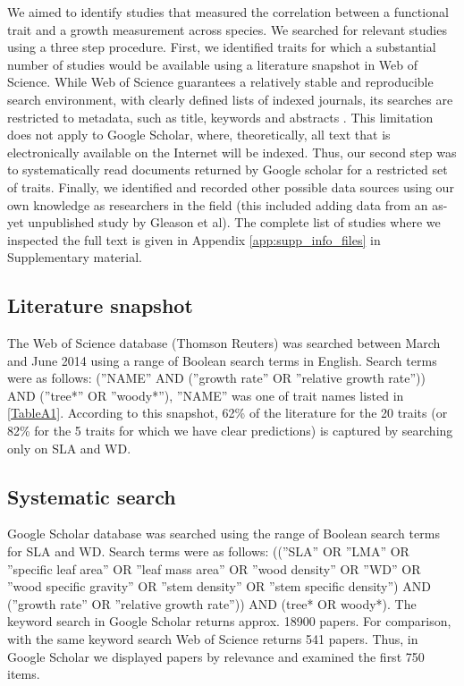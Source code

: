 \documentclass[a4paper]{article}\usepackage[]{graphicx}\usepackage[]{color}
\begin{document}
We aimed to identify studies that measured the correlation between a functional trait and a growth measurement across species. We searched for relevant studies using a three step procedure. First, we identified traits for which a substantial number of studies would be available using a literature snapshot in Web of Science. While Web of Science guarantees a relatively stable and reproducible search environment, with clearly defined lists of indexed journals, its searches are restricted to metadata, such as title, keywords and abstracts \citep{Beckmann:2012hn}. This limitation does not apply to Google Scholar, where, theoretically, all text that is electronically available on the Internet will be indexed. Thus, our second step was to systematically read documents returned by Google scholar for a restricted set of traits. Finally, we identified and recorded other possible data sources using our own knowledge as researchers in the field (this included adding data from an as-yet unpublished study by Gleason et al). The complete list of studies where we inspected the full text is given in Appendix \ref{app:supp_info_files} in Supplementary material.

\subsection*{Literature snapshot}\label{literature-snapshot}

The Web of Science database (Thomson Reuters) was searched between March and June 2014 using a range of Boolean search terms in English. Search terms were as follows: (''NAME'' AND (''growth rate'' OR ''relative growth rate'')) AND (''tree*'' OR ''woody*''), ''NAME'' was one of trait names listed in \ref{TableA1}. According to this snapshot, 62\% of the literature for the 20 traits (or 82\% for the 5 traits for which we have clear predictions) is captured by searching only on SLA and WD.

\subsection*{Systematic search}\label{systematic-search}

Google Scholar database was searched using the range of Boolean search terms for SLA and WD. Search terms were as follows: ((''SLA'' OR ''LMA'' OR ''specific leaf area'' OR ''leaf mass area'' OR ''wood density'' OR ''WD'' OR ''wood specific gravity'' OR ''stem density'' OR ''stem specific density'') AND (''growth rate'' OR ''relative growth rate'')) AND (tree* OR woody*). The keyword search in Google Scholar returns approx. 18900 papers. For comparison, with the same keyword search Web of Science returns 541 papers. Thus, in Google Scholar we displayed papers by relevance and examined the first 750 items. 
\end{document}
